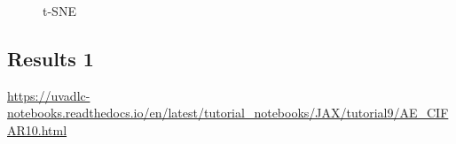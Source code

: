 \begin{figure}[!htb]
\qquad
{}
\caption{t-SNE }
\label{fig:tsne_beta_vae_bmnist}
\end{figure}


\subsection{Results 1}\label{sec:project results}



\url{https://uvadlc-notebooks.readthedocs.io/en/latest/tutorial_notebooks/JAX/tutorial9/AE_CIFAR10.html}




